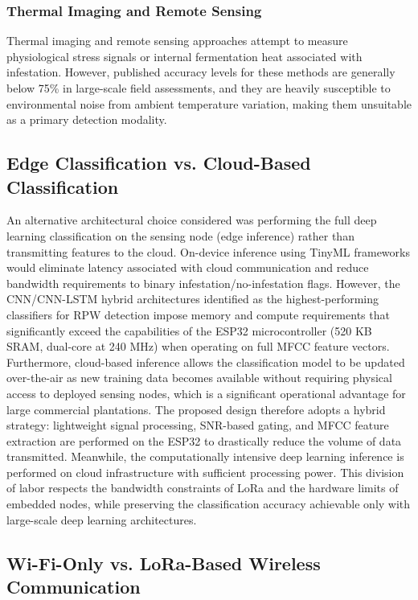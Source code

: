 \documentclass[12pt,a4paper,oneside]{memoir}
\begin{document}
\subsubsection{Thermal Imaging and Remote Sensing}
Thermal imaging and remote sensing approaches attempt to measure physiological stress signals or internal fermentation heat associated with infestation. However, published accuracy levels for these methods are generally below 75\% in large-scale field assessments, and they are heavily susceptible to environmental noise from ambient temperature variation, making them unsuitable as a primary detection modality.

\subsection{Edge Classification vs. Cloud-Based Classification}

An alternative architectural choice considered was performing the full deep learning classification on the sensing node (edge inference) rather than transmitting features to the cloud. On-device inference using TinyML frameworks would eliminate latency associated with cloud communication and reduce bandwidth requirements to binary infestation/no-infestation flags. However, the CNN/CNN-LSTM hybrid architectures identified as the highest-performing classifiers for RPW detection impose memory and compute requirements that significantly exceed the capabilities of the ESP32 microcontroller (520 KB SRAM, dual-core at 240 MHz) when operating on full MFCC feature vectors. Furthermore, cloud-based inference allows the classification model to be updated over-the-air as new training data becomes available without requiring physical access to deployed sensing nodes, which is a significant operational advantage for large commercial plantations. The proposed design therefore adopts a hybrid strategy: lightweight signal processing, SNR-based gating, and MFCC feature extraction are performed on the ESP32 to drastically reduce the volume of data transmitted. Meanwhile, the computationally intensive deep learning inference is performed on cloud infrastructure with sufficient processing power. This division of labor respects the bandwidth constraints of LoRa and the hardware limits of embedded nodes, while preserving the classification accuracy achievable only with large-scale deep learning architectures.

\subsection{Wi-Fi-Only vs. LoRa-Based Wireless Communication}
\end{document}
